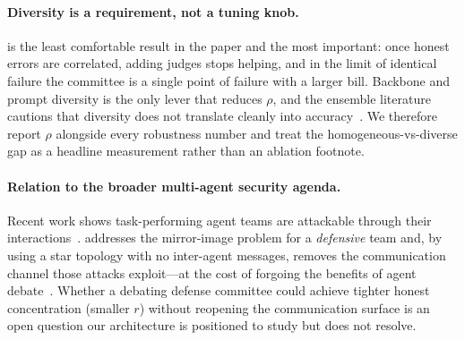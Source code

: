 \paragraph{Diversity is a requirement, not a tuning knob.}
 is the least comfortable result in the paper and the most important:
once honest errors are correlated, adding judges stops helping, and in the limit of
identical failure the committee is a single point of failure with a larger bill. Backbone
and prompt diversity is the only lever that reduces $\rho$, and the ensemble literature
cautions that diversity does not translate cleanly into
accuracy~\cite{kuncheva2003diversity}. We therefore report $\rho$ alongside every
robustness number and treat the homogeneous-vs-diverse gap as a headline measurement rather
than an ablation footnote.

\paragraph{Relation to the broader multi-agent security agenda.}
Recent work shows task-performing agent teams are attackable through their
interactions~\cite{lee2024promptinfection,he2025redteaming,ju2024flooding,zhou2025corba,zhang2024psysafe,zhang2024asb}.
\Aegis addresses the mirror-image problem for a \emph{defensive} team and, by using a star
topology with no inter-agent messages, removes the communication channel those attacks
exploit—at the cost of forgoing the benefits of agent debate~\cite{du2023debate}. Whether
a debating defense committee could achieve tighter honest concentration (smaller $r$)
without reopening the communication surface is an open question our architecture is
positioned to study but does not resolve.
